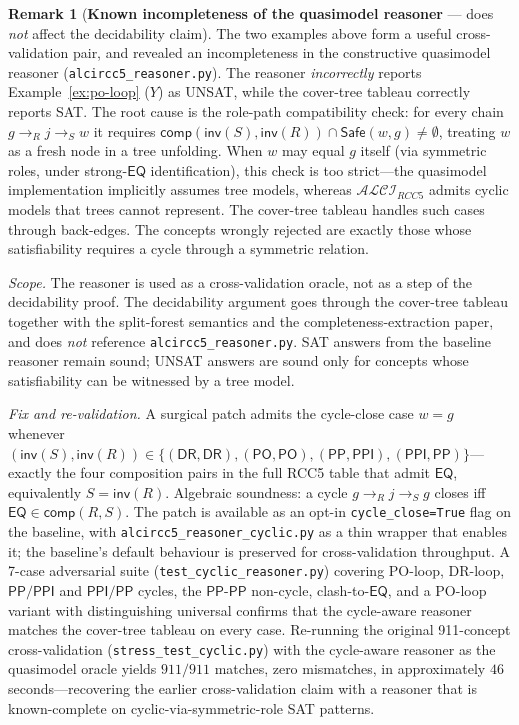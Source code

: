 \documentclass[
]{ceurart}
\theoremstyle{definition}
\newtheorem{remark}[theorem]{Remark}
\newcommand{\ALCIRCC}[1]{\ensuremath{\mathcal{ALCI}_{\mathit{RCC#1}}}}
\newcommand{\DR}{\ensuremath{\mathsf{DR}}}
\newcommand{\PO}{\ensuremath{\mathsf{PO}}}
\newcommand{\EQ}{\ensuremath{\mathsf{EQ}}}
\newcommand{\PP}{\ensuremath{\mathsf{PP}}}
\newcommand{\PPI}{\ensuremath{\mathsf{PPI}}}
\newcommand{\inv}{\ensuremath{\mathsf{inv}}}
\newcommand{\comp}{\ensuremath{\mathsf{comp}}}
\newcommand{\Safe}{\ensuremath{\mathsf{Safe}}}
\begin{document}
\begin{remark}[\textbf{Known incompleteness of the quasimodel reasoner} --- does \emph{not} affect the decidability claim]
\label{rem:qm-bug}
The two examples above form a useful cross-validation pair, and
revealed an incompleteness in the constructive quasimodel
reasoner (\texttt{alcircc5\_reasoner.py}).
The reasoner \emph{incorrectly} reports Example~\ref{ex:po-loop}
($Y$) as UNSAT, while the cover-tree tableau correctly reports
SAT.
The root cause is the role-path compatibility check: for every
chain $g \to_R j \to_S w$ it requires
$\comp(\inv(S), \inv(R)) \cap \Safe(w, g) \ne \emptyset$,
treating $w$ as a fresh node in a tree unfolding. When $w$ may
equal $g$ itself (via symmetric roles, under strong-$\EQ$
identification), this check is too strict---the quasimodel
implementation implicitly assumes tree models, whereas
$\ALCIRCC{5}$ admits cyclic models that trees cannot represent.
The cover-tree tableau handles such cases through back-edges.
The concepts wrongly rejected are exactly those whose
satisfiability requires a cycle through a symmetric relation.

\emph{Scope.} The reasoner is used as a cross-validation oracle,
not as a step of the decidability proof. The decidability
argument goes through the cover-tree tableau together with the
split-forest semantics and the completeness-extraction paper,
and does \emph{not} reference \texttt{alcircc5\_reasoner.py}.
SAT answers from the baseline reasoner remain sound; UNSAT
answers are sound only for concepts whose satisfiability can be
witnessed by a tree model.

\emph{Fix and re-validation.} A surgical patch admits the
cycle-close case $w = g$ whenever
$(\inv(S), \inv(R)) \in \{(\DR,\DR), (\PO,\PO), (\PP,\PPI),
(\PPI,\PP)\}$---exactly the four composition pairs in the full
RCC5 table that admit $\EQ$, equivalently $S = \inv(R)$. Algebraic
soundness: a cycle $g \to_R j \to_S g$ closes iff $\EQ \in
\comp(R, S)$. The patch is available as an opt-in
\texttt{cycle\_close=True} flag on the baseline, with
\texttt{alcircc5\_reasoner\_cyclic.py} as a thin wrapper that
enables it; the baseline's default behaviour is preserved for
cross-validation throughput. A 7-case adversarial suite
(\texttt{test\_cyclic\_reasoner.py}) covering PO-loop, DR-loop,
$\PP/\PPI$ and $\PPI/\PP$ cycles, the $\PP$-$\PP$ non-cycle,
clash-to-$\EQ$, and a PO-loop variant with distinguishing
universal confirms that the cycle-aware reasoner matches the
cover-tree tableau on every case. Re-running the original
911-concept cross-validation
(\texttt{stress\_test\_cyclic.py}) with the cycle-aware reasoner
as the quasimodel oracle yields $911/911$ matches, zero
mismatches, in approximately $46$ seconds---recovering the
earlier cross-validation claim with a reasoner that is
known-complete on cyclic-via-symmetric-role SAT patterns.
\end{remark}
\end{document}
